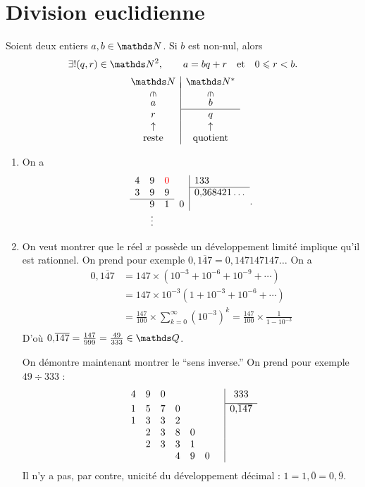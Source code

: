 \section{Division euclidienne}

\begin{thm}
	Soient deux entiers $a,b \in \N$. Si $b$\/ est non-nul, alors \[
		\exists!(q,r) \in \N^2,\qquad a = bq + r\quad\text{et}\quad0\le r < b
	.\]
	\[
		\begin{array}{c|c}
			\N&\N^*\\[-2mm]
			\vrt\in&\vrt\in\\[1mm]
			a&b\\ \cline{2-2}
			r&q\\
			\uparrow&\uparrow\\
			\text{reste}&\text{quotient}\\
		\end{array}
	\]
\end{thm}

\begin{exo}
	\begin{enumerate}
		\item On a \[
				\begin{array}{cccc|l}
					4&9&{\color{red}0}&&133\\\cline{5-5}
					3&9&9&&0{,}368421\ldots\\ \cline{1-3}
					 &9&1&0&\\
					 &\vdots\\
				\end{array}
			.\]
		\item On veut montrer que le réel $x$\/ possède un développement limité implique qu'il est rationnel.
			On prend pour exemple $0{,}\overline{147} = 0{,}147147147\ldots$
			On a
			\begin{align*}
				0{,}\overline{147} &= 147 \times \left( 10^{-3} + 10^{-6} + 10^{-9} + \cdots \right) \\
				&= 147 \times 10^{-3}(1 + 10^{-3} + 10^{-6} + \cdots) \\
				&= \frac{147}{100} \times \sum_{k=0}^\infty (10^{-3})^k = \frac{147}{100} \times \frac{1}{1- 10^{-3}} \\
			\end{align*}
			D'où $0{,}\overline{147} = \frac{147}{999} = \frac{49}{333} \in \Q$.

			On démontre maintenant montrer le ``sens inverse.'' On prend pour exemple $49 \div 333$\/ : \[
				\begin{array}{ccccccc|c}
					4&9&0&&&&&333\\[1mm] \cline{8-8}
					1&5&7&0&&&&0{,}\overline{147}\\
					1&3&3&2&&&\\
					&2&3&8&0&&\\
					&2&3&3&1&&\\
					&&&4&9&0&&\\
				\end{array}
			\]
			Il n'y a pas, par contre, unicité du développement décimal : $1 = 1{,}\overline0 = 0{,}\overline9$.
	\end{enumerate}
\end{exo}

